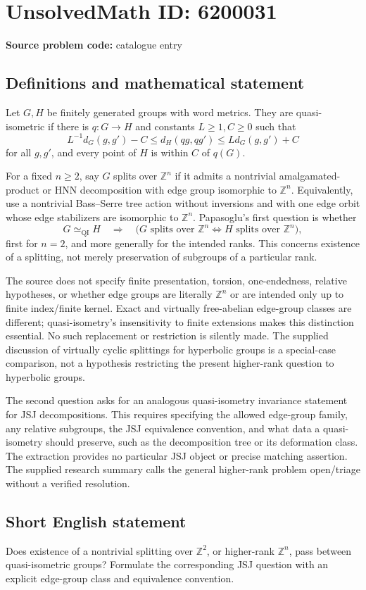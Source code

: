 \documentclass[11pt]{article}
\newcommand{\Z}{\mathbb{Z}}
\begin{document}
\section*{UnsolvedMath ID: 6200031}
\textbf{Source problem code:} catalogue entry
\subsection{Definitions and mathematical statement}
Let \(G,H\) be finitely generated groups with word metrics. They are quasi-isometric if there is \(q:G\to H\) and constants \(L\ge1,C\ge0\) such that
\[
L^{-1}d_G(g,g')-C\le d_H(qg,qg')\le Ld_G(g,g')+C
\]
for all \(g,g'\), and every point of \(H\) is within \(C\) of \(q(G)\).

For a fixed \(n\ge2\), say \(G\) splits over \(\Z^n\) if it admits a nontrivial amalgamated-product or HNN decomposition with edge group isomorphic to \(\Z^n\). Equivalently, use a nontrivial Bass--Serre tree action without inversions and with one edge orbit whose edge stabilizers are isomorphic to \(\Z^n\). Papasoglu's first question is whether
\[
G\simeq_{\mathrm{QI}}H\quad\Longrightarrow\quad
\bigl(G\text{ splits over }\Z^n\iff H\text{ splits over }\Z^n\bigr),
\]
first for \(n=2\), and more generally for the intended ranks. This concerns existence of a splitting, not merely preservation of subgroups of a particular rank.

The source does not specify finite presentation, torsion, one-endedness, relative hypotheses, or whether edge groups are literally \(\Z^n\) or are intended only up to finite index/finite kernel. Exact and virtually free-abelian edge-group classes are different; quasi-isometry's insensitivity to finite extensions makes this distinction essential. No such replacement or restriction is silently made. The supplied discussion of virtually cyclic splittings for hyperbolic groups is a special-case comparison, not a hypothesis restricting the present higher-rank question to hyperbolic groups.

The second question asks for an analogous quasi-isometry invariance statement for JSJ decompositions. This requires specifying the allowed edge-group family, any relative subgroups, the JSJ equivalence convention, and what data a quasi-isometry should preserve, such as the decomposition tree or its deformation class. The extraction provides no particular JSJ object or precise matching assertion. The supplied research summary calls the general higher-rank problem open/triage without a verified resolution.
\subsection{Short English statement}
Does existence of a nontrivial splitting over \(\Z^2\), or higher-rank \(\Z^n\), pass between quasi-isometric groups? Formulate the corresponding JSJ question with an explicit edge-group class and equivalence convention.
\end{document}
